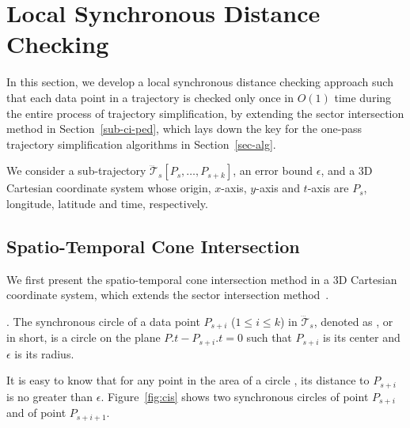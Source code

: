 \section{Local Synchronous Distance Checking}
\label{sec-localcheck}


In this section, we develop a local synchronous distance checking approach such that each data point in a trajectory is checked only once in $O(1)$ time during the entire process of trajectory simplification, by extending the sector intersection method in Section~\ref{sub-ci-ped}, which lays down the key for the one-pass trajectory simplification algorithms in Section~\ref{sec-alg}.

We consider a sub-trajectory $\dddot{\mathcal{T}}_s[P_s, \ldots, P_{s+k}]$, an error bound $\epsilon$, and a 3D Cartesian coordinate system whose origin, $x$-axis, $y$-axis and $t$-axis  are $P_s$, longitude, latitude and time, respectively.

\subsection{Spatio-Temporal Cone Intersection}

We first present the spatio-temporal cone intersection method in a 3D Cartesian coordinate system, which extends the sector intersection method~\cite{Williams:Longest, Sklansky:Cone, Zhao:Sleeve}. %





. The synchronous circle of a data point $P_{s+i}$ ($1\le i\le k$) in $\dddot{\mathcal{T}}_s$, denoted as , or  in short, is a circle on the plane $P.t-P_{s+i}.t = 0$ such that $P_{s+i}$ is its center and $\epsilon$ is its radius.


It is easy to know that for any point in the area of a circle , its distance to $P_{s+i}$ is no greater than $\epsilon$.
Figure~\ref{fig:cis} shows two synchronous circles  of point $P_{s+i}$ and  of point $P_{s+i+1}$.


